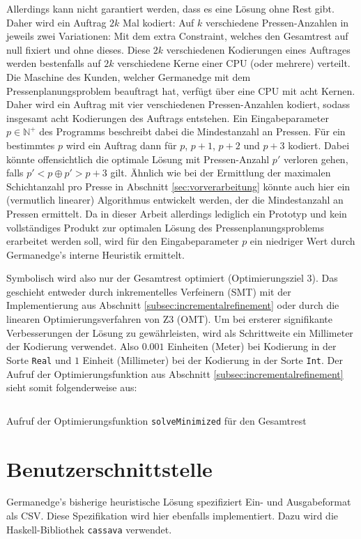 Allerdings kann nicht garantiert werden, dass es eine Lösung ohne Rest gibt.
Daher wird ein Auftrag $2k$ Mal kodiert: Auf $k$ verschiedene Pressen-Anzahlen in jeweils zwei Variationen:
Mit dem extra Constraint, welches den Gesamtrest auf null fixiert und ohne dieses.
Diese $2k$ verschiedenen Kodierungen eines Auftrages werden bestenfalls auf $2k$ verschiedene Kerne einer CPU (oder mehrere) verteilt.
Die Maschine des Kunden, welcher Germanedge mit dem Pressenplanungsproblem beauftragt hat, verfügt über eine CPU mit acht Kernen.
Daher wird ein Auftrag mit vier verschiedenen Pressen-Anzahlen kodiert, sodass insgesamt acht Kodierungen des Auftrags entstehen.
Ein Eingabeparameter $p \in \mathbb{N}^+$ des Programms beschreibt dabei die Mindestanzahl an Pressen.
Für ein bestimmtes $p$ wird ein Auftrag dann für $p$, $p+1$, $p+2$ und $p+3$ kodiert.
Dabei könnte offensichtlich die optimale Lösung mit Pressen-Anzahl $p\prime$ verloren gehen, falls $p\prime < p \oplus p\prime > p + 3$ gilt.
Ähnlich wie bei der Ermittlung der maximalen Schichtanzahl pro Presse in Abschnitt \ref{sec:vorverarbeitung} könnte auch hier ein
(vermutlich linearer) Algorithmus entwickelt werden, der die Mindestanzahl an Pressen ermittelt.
Da in dieser Arbeit allerdings lediglich ein Prototyp und kein vollständiges Produkt zur optimalen Lösung des Pressenplanungsproblems erarbeitet werden soll,
wird für den Eingabeparameter $p$ ein niedriger Wert durch Germanedge's interne Heuristik ermittelt.

Symbolisch wird also nur der Gesamtrest optimiert (Optimierungsziel 3).
Das geschieht entweder durch inkrementelles Verfeinern (SMT) mit der Implementierung aus Abschnitt \ref{subsec:incrementalrefinement} oder durch
die linearen Optimierungsverfahren von Z3 (OMT).
Um bei ersterer signifikante Verbesserungen der Lösung zu gewährleisten, wird als Schrittweite ein Millimeter der Kodierung verwendet.
Also $0.001$ Einheiten (Meter) bei Kodierung in der Sorte \texttt{Real} und $1$ Einheit (Millimeter) bei der Kodierung in der Sorte \texttt{Int}.
Der Aufruf der Optimierungsfunktion aus Abschnitt \ref{subsec:incrementalrefinement} sieht somit folgenderweise aus:

\begin{listing}[H]
    \inputminted[linenos=true]{haskell}{Code/Implementierung/OptimizationTotalWaste.hs}
    \caption{Aufruf der Optimierungsfunktion \texttt{solveMinimized} für den Gesamtrest}
    \label{listing:solveminimized}
\end{listing}

\section{Benutzerschnittstelle}
Germanedge's bisherige heuristische Lösung spezifiziert Ein- und Ausgabeformat als CSV.
Diese Spezifikation wird hier ebenfalls implementiert.
Dazu wird die Haskell-Bibliothek \texttt{cassava} \cite{cassava} verwendet.

